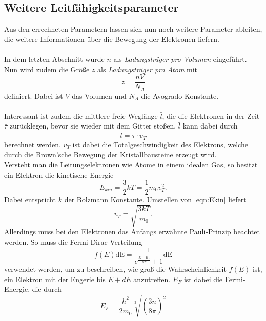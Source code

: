 \subsection{Weitere Leitfähigkeitsparameter}
Aus den errechneten Parametern lassen sich nun noch weitere Parameter ableiten, die weitere Informationen
über die Bewegung der Elektronen liefern.\\\\
In dem letzten Abschnitt wurde $n$ als \textit{Ladungsträger pro Volumen} eingeführt. Nun wird zudem die
Größe $z$ als \textit{Ladungsträger pro Atom} mit
\begin{equation}
    z=\frac{n V}{N_A}\label{eqn:z}
\end{equation}
definiert. Dabei ist $V$ das Volumen und $N_A$ die Avogrado-Konstante.\\\\
Interessant ist zudem die mittlere freie Weglänge $\bar{l}$, die die Elektronen in der Zeit $\bar{\tau}$ zurücklegen, bevor
sie wieder mit dem Gitter stoßen. $\bar{l}$ kann dabei durch
\begin{equation*}
    \bar{l}=\bar{\tau}\cdot v_T
\end{equation*}
berechnet werden. $v_T$ ist dabei die Totalgeschwindigkeit des Elektrons, welche durch die Brown'sche Bewegung
der Kristallbausteine erzeugt wird.\\
Versteht man die Leitungselektronen wie Atome in einem idealen Gas, so besitzt ein Elektron die kinetische Energie
\begin{equation}
    E_{kin}=\frac{3}{2}kT=\frac{1}{2}m_0v_T^2 . \label{eqn:Ekin}
\end{equation}
Dabei entspricht $k$ der Bolzmann Konstante. Umstellen von \eqref{eqn:Ekin} liefert
\begin{equation}
    v_T=\sqrt{\frac{3kT}{m_0}}. \label{eqn:vT1}
\end{equation}
Allerdings muss bei den Elektronen das Anfangs erwähnte Pauli-Prinzip beachtet werden. So muss die Fermi-Dirac-Verteilung
\begin{equation*}
    f(E)\text{dE}=\frac{1}{e^{\frac{E-E_f}{kT}}+1}\text{dE}
\end{equation*}
verwendet werden, um zu beschreiben, wie groß die Wahrscheinlichkeit $f(E)$ ist, ein
Elektron mit der Engerie bis $E+dE$ anzutreffen. $E_F$ ist dabei die Fermi-Energie, die durch
\begin{equation}
    E_F=\frac{h^2}{2m_0}\sqrt[3]{\left(\frac{3n}{8\pi}\right)^2} \label{eqn:EF}
\end{equation}
